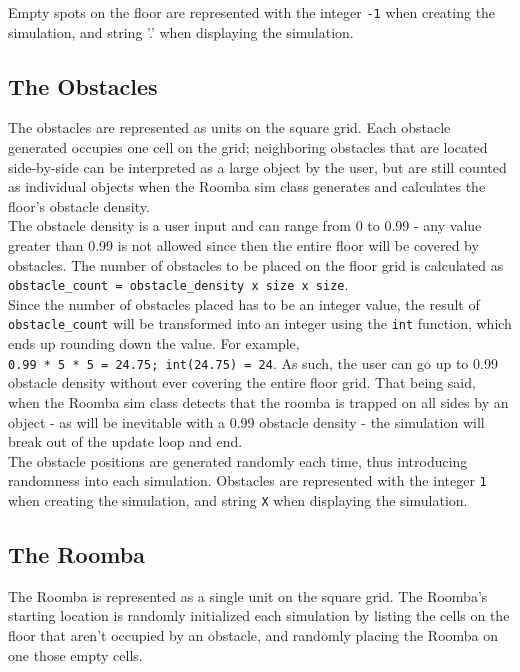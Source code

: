 \documentclass[11pt]{article}
\begin{document}
Empty spots on the floor are represented with the integer \texttt{-1}
when creating the simulation, and string '.' when displaying the
simulation.

\subsection{The Obstacles}

The obstacles are represented as units on the square grid. Each obstacle
generated occupies one cell on the grid; neighboring obstacles that are
located side-by-side can be interpreted as a large object by the user,
but are still counted as individual objects when the Roomba sim class
generates and calculates the floor's obstacle density.\\

The obstacle density is a user input and can range from 0 to 0.99 - any
value greater than 0.99 is not allowed since then the entire floor will
be covered by obstacles. The number of obstacles to be placed on the
floor grid is calculated as
\texttt{obstacle\_count\ =\ obstacle\_density\ x\ size\ x\ size}.\\

Since the number of obstacles placed has to be an integer value, the
result of \texttt{obstacle\_count} will be transformed into an integer
using the \texttt{int} function, which ends up rounding down the value.
For example, \texttt{0.99\ *\ 5\ *\ 5\ =\ 24.75;\ int(24.75)\ =\ 24}. As
such, the user can go up to 0.99 obstacle density without ever covering
the entire floor grid. That being said, when the Roomba sim class
detects that the roomba is trapped on all sides by an object - as will
be inevitable with a 0.99 obstacle density - the simulation will break
out of the update loop and end.\\

The obstacle positions are generated randomly each time, thus
introducing randomness into each simulation. Obstacles are represented with the integer \texttt{1} when creating the
simulation, and string \texttt{X} when displaying the simulation.

\subsection{The Roomba}

The Roomba is represented as a single unit on the square grid. The
Roomba's starting location is randomly initialized each simulation by
listing the cells on the floor that aren't occupied by an obstacle, and
randomly placing the Roomba on one those empty cells.\\
\end{document}
